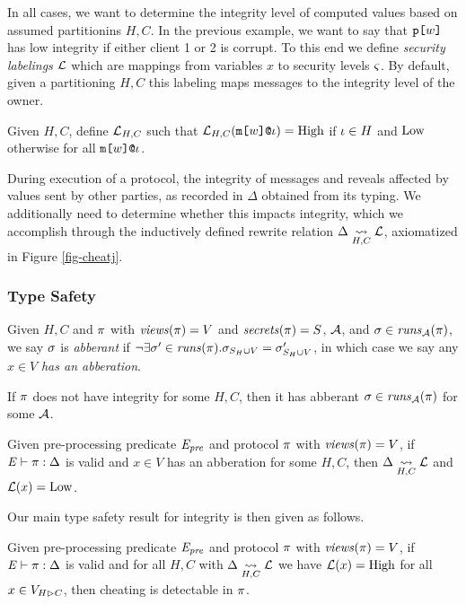 In all cases, we want to determine the integrity level of computed
values based on assumed partitionins $H,C$. In the previous example,
we want to say that $\texttt{p[}w\texttt{]}$ has low integrity if either client 1 or
2 is corrupt.  To this end we define \emph{security labelings}
$\mathcal{L}$ which are mappings from variables $x$ to security levels
$\varsigma$. By default, given a partitioning $H,C$ this labeling maps
messages to the integrity level of the owner.
\begin{definition}  
  Given $H,C$,
  define $\mathcal{L}_{H,C}$ such that $\mathcal{L}_{H,C}(\texttt{m[}w\texttt{]}\texttt{@}\iota ) = \mathrm{High}$
  if $\iota \in H$  and $\mathrm{Low}$
  otherwise for all $\texttt{m[}w\texttt{]}\texttt{@}\iota$.
\end{definition}
During execution of a protocol, the integrity of messages and reveals
affected by values sent by other parties, as recorded in $\Delta$
obtained from its typing. We additionally need to determine
whether this impacts integrity, which we accomplish through
the inductively defined rewrite relation $\Delta \underset{H,C}{\leadsto} \mathcal{L}$,
axiomatized in Figure \ref{fig-cheatj}.

\subsubsection{Type Safety}

\begin{definition}
  Given $H,C$ and $\pi$ with $\mathit{views}(\pi) = V$ and $\mathit{secrets}(\pi) = S$,
  $\mathcal{A}$, and $\sigma \in \mathit{runs}_{\mathcal{A}}(\pi)$, we say $\sigma$ is
  \emph{abberant} if $\neg\exists \sigma' \in \mathit{runs}(\pi) .
  \sigma_{S_H \cup V} = \sigma'_{S_H \cup V}$, in which case we say
  any $x \in V$ \emph{has an abberation}.
\end{definition}

\begin{lemma}
  If $\pi$ does not have integrity for some $H,C$, then it has
  abberant $\sigma \in \mathit{runs}_{\mathcal{A}}(\pi)$ for some $\mathcal{A}$. 
\end{lemma}

\begin{lemma}
  Given pre-processing predicate $\mathit{E}_{\mathit{pre}}$ and protocol $\pi$ with
  $\mathit{views}(\pi) = V$, if 
  $\mathit{E} \vdash \pi : \Delta$ is valid
  and $x\in V$ has an abberation for some $H,C$,
  then $\Delta \underset{H,C}{\leadsto} \mathcal{L}$ and $\mathcal{L}(x) = \mathrm{Low}$.
\end{lemma}

Our main type safety result for integrity is then given as follows.
\begin{theorem}
  Given pre-processing predicate $\mathit{E}_{\mathit{pre}}$ and protocol $\pi$ with
  $\mathit{views}(\pi) = V$, if
  $\mathit{E} \vdash \pi : \Delta$ is valid
  and for all $H,C$ with $\Delta \underset{H,C}{\leadsto} \mathcal{L}$ 
  we have $\mathcal{L}(x) = \mathrm{High}$ for all $x \in V_{H \rhd C}$, then cheating
  is detectable in $\pi$.
\end{theorem}
